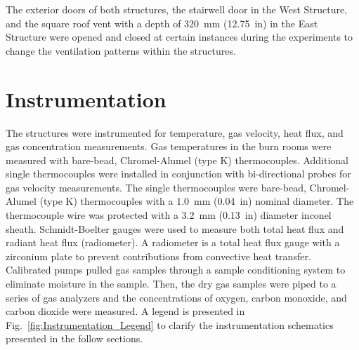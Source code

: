 \documentclass[12pt,oneside]{book}
\begin{document}

The exterior doors of both structures, the stairwell door in the West Structure, and the square roof vent with a depth of 320~mm (12.75~in) in the East Structure were opened and closed at certain instances during the experiments to change the ventilation patterns within the structures.


\section{Instrumentation}
\label{sec:Instrumentation}
The structures were instrumented for temperature, gas velocity, heat flux, and gas concentration measurements. Gas temperatures in the burn rooms were measured with bare-bead, Chromel-Alumel (type K) thermocouples. Additional single thermocouples were installed in conjunction with bi-directional probes for gas velocity measurements. The single thermocouples were bare-bead, Chromel-Alumel (type K) thermocouples with a 1.0~mm (0.04~in) nominal diameter. The thermocouple wire was protected with a 3.2~mm (0.13~in) diameter inconel sheath. Schmidt-Boelter gauges were used to measure both total heat flux and radiant heat flux (radiometer). A radiometer is a total heat flux gauge with a zirconium plate to prevent contributions from convective heat transfer. Calibrated pumps pulled gas samples through a sample conditioning system to eliminate moisture in the sample. Then, the dry gas samples were piped to a series of gas analyzers and the concentrations of oxygen, carbon monoxide, and carbon dioxide were measured. A legend is presented in Fig.~\ref{fig:Instrumentation_Legend} to clarify the instrumentation schematics presented in the follow sections.
\end{document}

